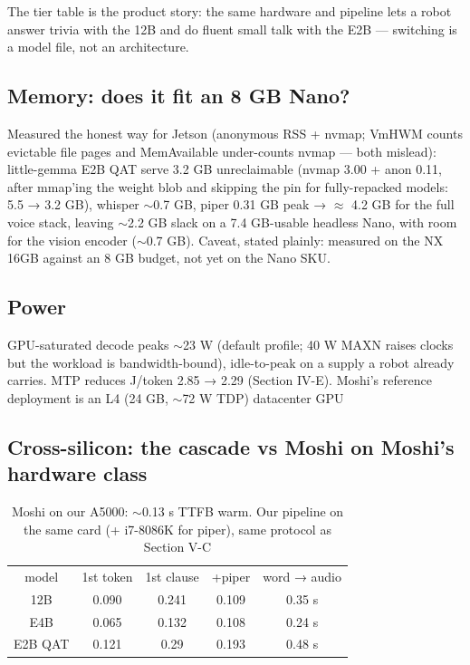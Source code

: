 \documentclass[journal]{IEEEtran}
\begin{document}
The tier table is the product story: the same hardware and pipeline lets a robot answer trivia with the 12B and do fluent small talk with the E2B — switching is a model file, not an architecture.

\subsection{Memory: does it fit an 8 GB Nano?}
Measured the honest way for Jetson (anonymous RSS + nvmap; VmHWM counts evictable file pages and MemAvailable under-counts nvmap — both mislead): little-gemma E2B QAT serve 3.2 GB unreclaimable (nvmap 3.00 + anon 0.11, after mmap'ing the weight blob and skipping the pin for fully-repacked models: 5.5 → 3.2 GB), whisper $\sim$0.7 GB, piper 0.31 GB peak → $\approx$ 4.2 GB for the full voice stack, leaving $\sim$2.2 GB slack on a 7.4 GB-usable headless Nano, with room for the vision encoder ($\sim$0.7 GB). Caveat, stated plainly: measured on the NX 16GB against an 8 GB budget, not yet on the Nano SKU.

\subsection{Power}
GPU-saturated decode peaks $\sim$23 W (default profile; 40 W MAXN raises clocks but the workload is bandwidth-bound), idle-to-peak on a supply a robot already carries. MTP reduces J/token 2.85 → 2.29 (Section IV-E). Moshi's reference deployment is an L4 (24 GB, $\sim$72 W TDP) datacenter GPU

\subsection{Cross-silicon: the cascade vs Moshi on Moshi's hardware class}
\begin{table}[H]
    \centering
    \small
    \begin{tabular}{ccccc}
       model  &  1st token & 1st clause & +piper & word → audio \\
        12B &  0.090& 0.241 & 0.109&0.35 s\\
        E4B & 0.065 & 0.132 & 0.108&0.24 s\\
        E2B QAT & 0.121& 0.29 & 0.193 	&0.48 s\\
    \end{tabular}
    \caption{Moshi on our A5000: $\sim$0.13 s TTFB warm. Our pipeline on the same card (+ i7-8086K for piper), same protocol as Section V-C}
    \label{tab:pipeline}
\end{table}
\end{document}
